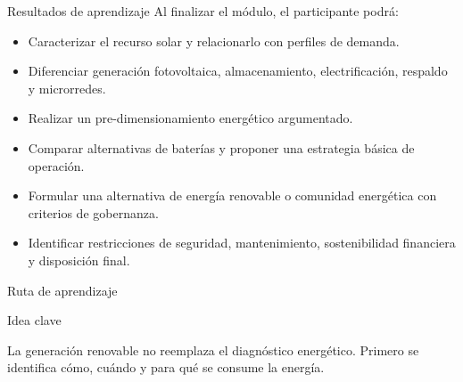 \documentclass[aspectratio=169,10pt]{beamer}
\newcommand{\idea}[1]{
\begin{block}{Idea clave}
#1
\end{block}
}
\begin{document}
\begin{frame}{Resultados de aprendizaje}
Al finalizar el módulo, el participante podrá:

\begin{itemize}
    \item Caracterizar el recurso solar y relacionarlo con perfiles de demanda.
    \item Diferenciar generación fotovoltaica, almacenamiento, electrificación, respaldo y microrredes.
    \item Realizar un pre-dimensionamiento energético argumentado.
    \item Comparar alternativas de baterías y proponer una estrategia básica de operación.
    \item Formular una alternativa de energía renovable o comunidad energética con criterios de gobernanza.
    \item Identificar restricciones de seguridad, mantenimiento, sostenibilidad financiera y disposición final.
\end{itemize}
\end{frame}

\begin{frame}{Ruta de aprendizaje}
\centering
{}

\vspace{0.4cm}

\idea{
La generación renovable no reemplaza el diagnóstico energético. Primero se identifica cómo, cuándo y para qué se consume la energía.
}
\end{frame}
\end{document}
